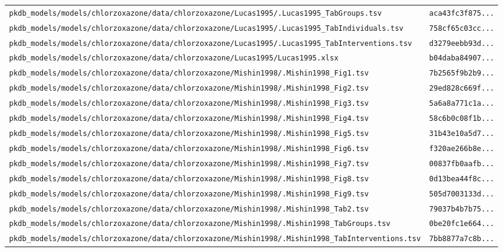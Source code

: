 \documentclass{article}
\begin{document}
\begin{longtable}{ll}
\texttt{pkdb\_models/models/chlorzoxazone/data/chlorzoxazone/Lucas1995/.Lucas1995\_TabGroups.tsv} & \texttt{aca43fc3f875...} \\
\texttt{pkdb\_models/models/chlorzoxazone/data/chlorzoxazone/Lucas1995/.Lucas1995\_TabIndividuals.tsv} & \texttt{758cf65c03cc...} \\
\texttt{pkdb\_models/models/chlorzoxazone/data/chlorzoxazone/Lucas1995/.Lucas1995\_TabInterventions.tsv} & \texttt{d3279eebb93d...} \\
\texttt{pkdb\_models/models/chlorzoxazone/data/chlorzoxazone/Lucas1995/Lucas1995.xlsx} & \texttt{b04daba84907...} \\
\texttt{pkdb\_models/models/chlorzoxazone/data/chlorzoxazone/Mishin1998/.Mishin1998\_Fig1.tsv} & \texttt{7b2565f9b2b9...} \\
\texttt{pkdb\_models/models/chlorzoxazone/data/chlorzoxazone/Mishin1998/.Mishin1998\_Fig2.tsv} & \texttt{29ed828c669f...} \\
\texttt{pkdb\_models/models/chlorzoxazone/data/chlorzoxazone/Mishin1998/.Mishin1998\_Fig3.tsv} & \texttt{5a6a8a771c1a...} \\
\texttt{pkdb\_models/models/chlorzoxazone/data/chlorzoxazone/Mishin1998/.Mishin1998\_Fig4.tsv} & \texttt{58c6b0c08f1b...} \\
\texttt{pkdb\_models/models/chlorzoxazone/data/chlorzoxazone/Mishin1998/.Mishin1998\_Fig5.tsv} & \texttt{31b43e10a5d7...} \\
\texttt{pkdb\_models/models/chlorzoxazone/data/chlorzoxazone/Mishin1998/.Mishin1998\_Fig6.tsv} & \texttt{f320ae266b8e...} \\
\texttt{pkdb\_models/models/chlorzoxazone/data/chlorzoxazone/Mishin1998/.Mishin1998\_Fig7.tsv} & \texttt{00837fb0aafb...} \\
\texttt{pkdb\_models/models/chlorzoxazone/data/chlorzoxazone/Mishin1998/.Mishin1998\_Fig8.tsv} & \texttt{0d13bea44f8c...} \\
\texttt{pkdb\_models/models/chlorzoxazone/data/chlorzoxazone/Mishin1998/.Mishin1998\_Fig9.tsv} & \texttt{505d7003133d...} \\
\texttt{pkdb\_models/models/chlorzoxazone/data/chlorzoxazone/Mishin1998/.Mishin1998\_Tab2.tsv} & \texttt{79037b4b7b75...} \\
\texttt{pkdb\_models/models/chlorzoxazone/data/chlorzoxazone/Mishin1998/.Mishin1998\_TabGroups.tsv} & \texttt{0be20fc1e664...} \\
\texttt{pkdb\_models/models/chlorzoxazone/data/chlorzoxazone/Mishin1998/.Mishin1998\_TabInterventions.tsv} & \texttt{7bb8877a7c8b...} \\

\end{longtable}
\end{document}
